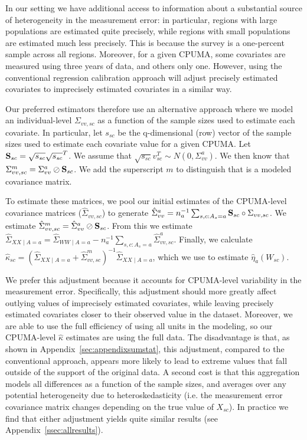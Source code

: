 In our setting we have additional access to information about a substantial source of heterogeneity in the measurement error: in particular, regions with large populations are estimated quite precisely, while regions with small populations are estimated much less precisely. This is because the survey is a one-percent sample across all regions. Moreover, for a given CPUMA, some covariates are measured using three years of data, and others only one. However, using the conventional regression calibration approach will adjust precisely estimated covariates to imprecisely estimated covariates in a similar way. 

Our preferred estimators therefore use an alternative approach where we model an individual-level $\Sigma_{vv, sc}$ as a function of the sample sizes used to estimate each covariate. In particular, let $s_{sc}$ be the q-dimensional (row) vector of the sample sizes used to estimate each covariate value for a given CPUMA. Let $\mathbf{S}_{sc} = \sqrt{s_{sc}}\sqrt{s_{sc}}^T$. We assume that $\sqrt{s_{sc}}v_{sc}^T \sim N(0, \Sigma_{vv}^a)$. We then know that $\Sigma_{vv, sc}^m = \Sigma_{vv}^a \oslash \mathbf{S}_{sc}$. We add the superscript $m$ to distinguish that is a modeled covariance matrix.

To estimate these matrices, we pool our initial estimates of the CPUMA-level covariance matrices ($\hat{\Sigma}_{vv, sc}$) to generate $\hat{\Sigma}_{vv}^a = n_a^{-1}\sum_{s, c: A_s = a} \mathbf{S}_{sc} \circ \Sigma_{vv, sc}$. We estimate $\hat{\Sigma}_{vv, sc}^m = \hat{\Sigma}_{vv}^a \oslash \mathbf{S}_{sc}$. From this we estimate $\hat{\Sigma}_{XX \mid A = a} = \hat{\Sigma}_{WW \mid A = a} - n_a^{-1}\sum_{s, c: A_s = a}\hat{\Sigma}_{vv, sc}^a$. Finally, we calculate $\hat{\kappa}_{sc} = (\hat{\Sigma}_{XX \mid A = a} + \hat{\Sigma}_{vv, sc}^m)^{-1}\hat{\Sigma}_{XX \mid A = a}$, which we use to estimate $\hat{\eta}_a(W_{sc})$. 

We prefer this adjustment because it accounts for CPUMA-level variability in the measurement error. Specifically, this adjustment should more greatly affect outlying values of imprecisely estimated covariates, while leaving precisely estimated covariates closer to their observed value in the dataset. Moreover, we are able to use the full efficiency of using all units in the modeling, so our CPUMA-level $\hat{\kappa}$ estimates are using the full data. The disadvantage is that, as shown in Appendix~\ref{sec:appendixsumstat}, this adjustment, compared to the conventional approach, appears more likely to lead to extreme values that fall outside of the support of the original data. A second cost is that this aggregation models all differences as a function of the sample sizes, and averages over any potential heterogeneity due to heteroskedasticity (i.e. the measurement error covariance matrix changes depending on the true value of $X_{sc}$). In practice we find that either adjustment yields quite similar results (see Appendix~\ref{ssec:allresults}).
